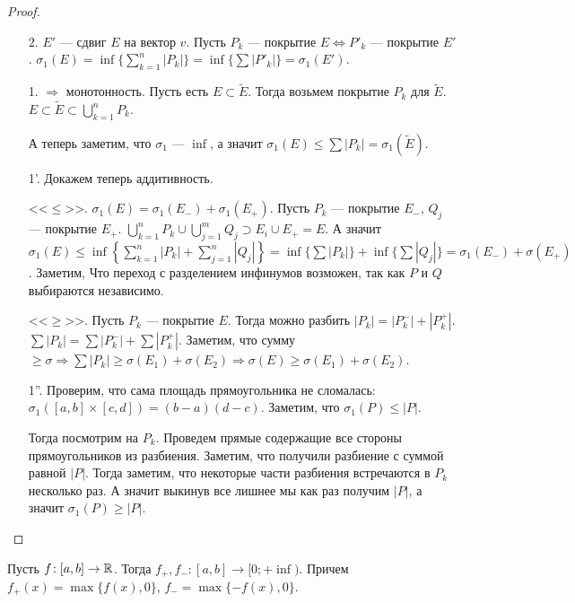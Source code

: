 \begin{proof}
    \slashn
    \begin{enumerate}
        \item[2.] $E'$ --- сдвиг  $E$ на вектор  $v$. Пусть  $P_k$ --- покрытие  $E \iff P'_k$ --- покрытие  $E'$.
            $\sigma_1(E) = \inf\{\sum\limits_{k=1}^n|P_k|\} = \inf\{\sum |P'_k|\} = \sigma_1(E')$.
        \item[1.] $\Rightarrow$ монотонность. Пусть есть  $E \subset \widetilde{E}$. Тогда возьмем покрытие  $P_k$ для  $\widetilde{E}$.  $E \subset \widetilde{E} \subset \bigcup\limits_{k=1}^n P_k$. 

            А теперь заметим, что $\sigma_1$ ---  $\inf$, а значит  $\sigma_1(E) \le \sum |P_k| = \sigma_1(\widetilde{E})$.

        \item[1'.] Докажем теперь аддитивность. 

            <<$\le$>>. $\sigma_1(E) = \sigma_1(E_-) + \sigma_1(E_+)$. Пусть $P_k$ --- покрытие  $E_-$,  $Q_j$ --- покрытие  $E_+$.  $\bigcup\limits_{k=1}^n P_k \cup \bigcup\limits_{j=1}^m Q_j \supset E_i \cup E_+ = E$. А значит  $\sigma_1(E) \le \inf \left\{ \sum\limits_{k=1}^n |P_k| + \sum\limits_{j=1}^n |Q_j|\right\} = \inf\{\sum |P_k|\} + \inf\{\sum |Q_j|\} = \sigma_1(E_-) + \sigma(E_+)$. Заметим, Что переход с разделением инфинумов  возможен, так как $P$ и  $Q$ выбираются независимо.

            <<$\ge$>>. Пусть $P_k$ --- покрытие  $E$. Тогда можно разбить  $|P_k| = |P^-_k| + |P^+_k|$.  $\sum |P_k| = \sum |P^-_k| + \sum |P^+_k|$. Заметим, что сумму  $\ge \sigma \Rightarrow \sum |P_k|  \ge \sigma(E_1) + \sigma(E_2) \Rightarrow \sigma(E) \ge \sigma(E_1) + \sigma(E_2)$.

        \item[1''.] Проверим, что сама площадь прямоугольника не сломалась: $\sigma_1([a, b] \times [c, d]) = (b-a)(d-c)$. Заметим, что  $\sigma_1(P) \le |P|$.

            Тогда посмотрим на $P_k$. Проведем прямые содержащие все стороны прямоугольников из разбиения. Заметим, что получили разбиение с суммой равной  $|P|$. Тогда заметим, что некоторые части разбиения встречаются в  $P_k$ несколько раз. А значит выкинув все лишнее мы как раз получим  $|P|$, а значит  $\sigma_1(P) \ge |P|$.
    \end{enumerate}
\end{proof}
\begin{definition}
    Пусть $f\!: [a, b] \to \mathbb{R}$. Тогда  $f_+, f_-\!: [a, b] \to [0; +\inf)$. Причем  $f_+(x) = \max\{f(x), 0\}$,  $f_- = \max\{-f(x), 0\}$.
\end{definition}
